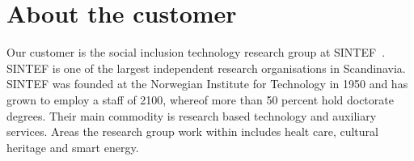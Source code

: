 \section{About the customer}

Our customer is the social inclusion technology research group at SINTEF~\cite{sintef}. SINTEF is one of the largest independent research organisations in Scandinavia. SINTEF was founded at the Norwegian Institute for Technology in 1950 and has grown to employ a staff of 2100, whereof more than 50 percent hold doctorate degrees. Their main commodity is research based technology and auxiliary services. Areas the research group work within includes healt care, cultural heritage and smart energy.

